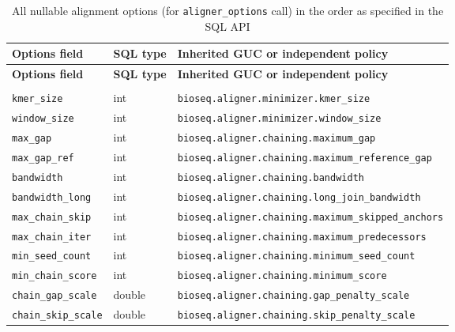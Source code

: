 \begingroup
\footnotesize
\setlength{\tabcolsep}{3pt}
\renewcommand{\arraystretch}{1.12}
\begin{longtable}{@{}>{\raggedright\arraybackslash}p{.28\linewidth}>{\raggedright\arraybackslash}p{.10\linewidth}>{\raggedright\arraybackslash}p{}@{}}
\caption{All nullable alignment options (for \texttt{aligner\_options} call) in the order as specified in the SQL API}\label{tab:configuration-options}\\
\toprule
\textbf{Options field} & \textbf{SQL type} & \textbf{Inherited GUC or independent policy}\\
\midrule
\endfirsthead
\toprule
\textbf{Options field} & \textbf{SQL type} & \textbf{Inherited GUC or independent policy}\\
\midrule
\endhead
\midrule
\multicolumn{3}{r}{\textit{Continued on the next page}}\\
\endfoot
\bottomrule
\endlastfoot
\nolinkurl{kmer_size} & int & \nolinkurl{bioseq.aligner.minimizer.kmer_size}\\[3pt]
\nolinkurl{window_size} & int & \nolinkurl{bioseq.aligner.minimizer.window_size}\\[3pt]
\nolinkurl{max_gap} & int & \nolinkurl{bioseq.aligner.chaining.maximum_gap}\\[3pt]
\nolinkurl{max_gap_ref} & int & \nolinkurl{bioseq.aligner.chaining.maximum_reference_gap}\\[3pt]
\nolinkurl{bandwidth} & int & \nolinkurl{bioseq.aligner.chaining.bandwidth}\\[3pt]
\nolinkurl{bandwidth_long} & int & \nolinkurl{bioseq.aligner.chaining.long_join_bandwidth}\\[3pt]
\nolinkurl{max_chain_skip} & int & \nolinkurl{bioseq.aligner.chaining.maximum_skipped_anchors}\\[3pt]
\nolinkurl{max_chain_iter} & int & \nolinkurl{bioseq.aligner.chaining.maximum_predecessors}\\[3pt]
\nolinkurl{min_seed_count} & int & \nolinkurl{bioseq.aligner.chaining.minimum_seed_count}\\[3pt]
\nolinkurl{min_chain_score} & int & \nolinkurl{bioseq.aligner.chaining.minimum_score}\\[3pt]
\nolinkurl{chain_gap_scale} & double & \nolinkurl{bioseq.aligner.chaining.gap_penalty_scale}\\[3pt]
\nolinkurl{chain_skip_scale} & double & \nolinkurl{bioseq.aligner.chaining.skip_penalty_scale}\\[3pt]

\end{longtable}
